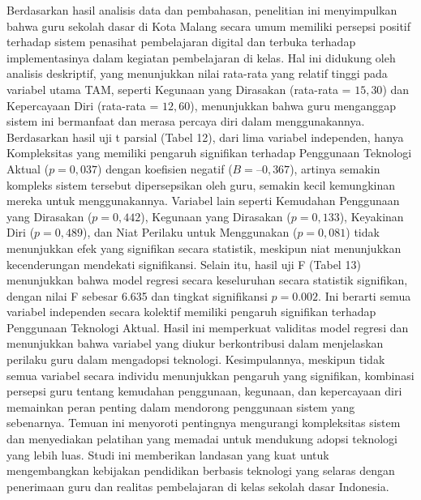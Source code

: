 Berdasarkan hasil analisis data dan pembahasan, penelitian ini menyimpulkan bahwa guru sekolah dasar di Kota Malang secara umum memiliki persepsi positif terhadap sistem penasihat pembelajaran digital dan terbuka terhadap implementasinya dalam kegiatan pembelajaran di kelas. Hal ini didukung oleh analisis deskriptif, yang menunjukkan nilai rata-rata yang relatif tinggi pada variabel utama TAM, seperti Kegunaan yang Dirasakan (rata-rata = $15,30$) dan Kepercayaan Diri (rata-rata = $12,60$), menunjukkan bahwa guru menganggap sistem ini bermanfaat dan merasa percaya diri dalam menggunakannya. Berdasarkan hasil uji t parsial (Tabel 12), dari lima variabel independen, hanya Kompleksitas yang memiliki pengaruh signifikan terhadap Penggunaan Teknologi Aktual ($p = 0,037$) dengan koefisien negatif ($B = –0,367$), artinya semakin kompleks sistem tersebut dipersepsikan oleh guru, semakin kecil kemungkinan mereka untuk menggunakannya. Variabel lain seperti Kemudahan Penggunaan yang Dirasakan ($p = 0,442$), Kegunaan yang Dirasakan ($p = 0,133$), Keyakinan Diri ($p = 0,489$), dan Niat Perilaku untuk Menggunakan ($p = 0,081$) tidak menunjukkan efek yang signifikan secara statistik, meskipun niat menunjukkan kecenderungan mendekati signifikansi. Selain itu, hasil uji F (Tabel 13) menunjukkan bahwa model regresi secara keseluruhan secara statistik signifikan, dengan nilai F sebesar 6.635 dan tingkat signifikansi $p = 0.002$. Ini berarti semua variabel independen secara kolektif memiliki pengaruh signifikan terhadap Penggunaan Teknologi Aktual. Hasil ini memperkuat validitas model regresi dan menunjukkan bahwa variabel yang diukur berkontribusi dalam menjelaskan perilaku guru dalam mengadopsi teknologi. Kesimpulannya, meskipun tidak semua variabel secara individu menunjukkan pengaruh yang signifikan, kombinasi persepsi guru tentang kemudahan penggunaan, kegunaan, dan kepercayaan diri memainkan peran penting dalam mendorong penggunaan sistem yang sebenarnya. Temuan ini menyoroti pentingnya mengurangi kompleksitas sistem dan menyediakan pelatihan yang memadai untuk mendukung adopsi teknologi yang lebih luas. Studi ini memberikan landasan yang kuat untuk mengembangkan kebijakan pendidikan berbasis teknologi yang selaras dengan penerimaan guru dan realitas pembelajaran di kelas sekolah dasar Indonesia.
